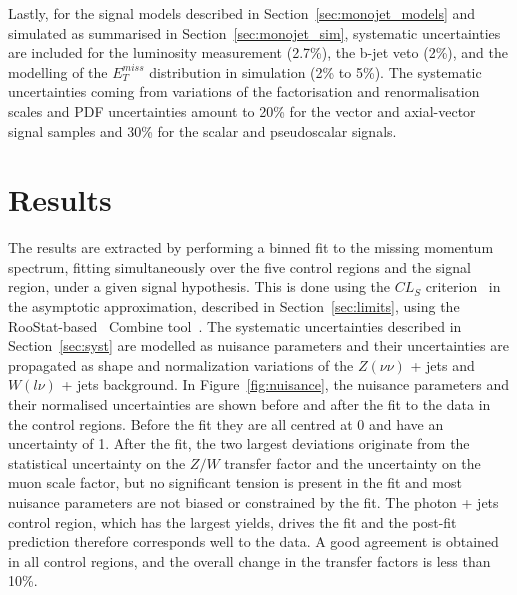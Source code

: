 Lastly, for the signal models described in Section~\ref{sec:monojet_models} and simulated as summarised in Section~\ref{sec:monojet_sim}, systematic uncertainties are included for the luminosity measurement (2.7\%), the b-jet veto (2\%), and the modelling of the $E_T^{miss}$ distribution in simulation (2\% to 5\%). The systematic uncertainties coming from variations of the factorisation and renormalisation scales and PDF uncertainties amount to 20\% for the vector and axial-vector signal samples and 30\% for the scalar and pseudoscalar signals.

\section{Results}
\label{sec:results}

The results are extracted by performing a binned fit to the missing momentum spectrum, fitting simultaneously over the five control regions and the signal region, under a given signal hypothesis. This is done using the $CL_S$ criterion~\cite{CLS1,CLS2} in the asymptotic approximation, described in Section~\ref{sec:limits}, using the RooStat-based~\cite{Moneta:2010pm} Combine tool~\cite{combine}. The systematic uncertainties described in Section~\ref{sec:syst} are modelled as nuisance parameters and their uncertainties are propagated as shape and normalization variations of the $Z(\nu\nu)$ + jets and $W(l\nu)$ + jets background. In Figure~\ref{fig:nuisance}, the nuisance parameters and their normalised uncertainties are shown before and after the fit to the data in the control regions. Before the fit they are all centred at 0 and have an uncertainty of 1. After the fit, the two largest deviations originate from the statistical uncertainty on the $Z/W$ transfer factor and the uncertainty on the muon scale factor, but no significant tension is present in the fit and most nuisance parameters are not biased or constrained by the fit.
The photon + jets control region, which has the largest yields, drives the fit and the post-fit prediction therefore corresponds well to the data. A good agreement is obtained in all control regions, and the overall change in the transfer factors is less than 10\%.

